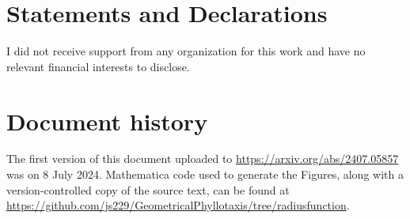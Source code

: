 \documentclass[a4paper,10pt]{amsart}
\begin{document}
\section*{Statements and Declarations} 
I did not receive support from any organization for this work and have no relevant financial interests to disclose. 
\printbibliography
\section{Document history}
The first version of this document  uploaded to \url{https://arxiv.org/abs/2407.05857} was on 8 July 2024.  Mathematica code used to generate the Figures, along with a version-controlled copy of the source text, can be found at \url{https://github.com/js229/GeometricalPhyllotaxis/tree/radiusfunction}.
\end{document}
